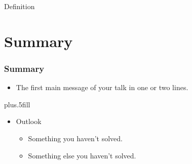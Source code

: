 \documentclass[pdftex, handout]{beamer}
\begin{document}
\begin{frame}
\end{frame}

\begin{frame}
\end{frame}

\begin{frame}{Definition}
\end{frame}


\section*{Summary}

\begin{frame}
  \frametitle<presentation>{Summary}

  \begin{itemize}
  \item The \alert{first main message} of your talk in one or two lines.
  \end{itemize}

  \vskip0pt plus.5fill
  \begin{itemize}
  \item Outlook
    \begin{itemize}
    \item Something you haven't solved.
    \item Something else you haven't solved.
    \end{itemize}
  \end{itemize}
\end{frame}
\end{document}
